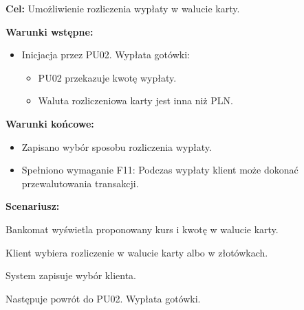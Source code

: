 \documentclass[10pt,a4paper]{article}
\begin{document}
\noindent\textbf{Cel:} Umożliwienie rozliczenia wypłaty w walucie karty.

\noindent\textbf{Warunki wstępne:}
\begin{itemize}
    \item Inicjacja przez PU02. Wypłata gotówki:
    \begin{itemize}
        \item PU02 przekazuje kwotę wypłaty.
        \item Waluta rozliczeniowa karty jest inna niż PLN.
    \end{itemize}
\end{itemize}

\noindent\textbf{Warunki końcowe:}
\begin{itemize}
    \item Zapisano wybór sposobu rozliczenia wypłaty.
    \item Spełniono wymaganie F11: Podczas wypłaty klient może dokonać przewalutowania transakcji.
\end{itemize}

\noindent\textbf{Scenariusz:}
\begin{scenariusz}
    \item Bankomat wyświetla proponowany kurs i kwotę w walucie karty.
    \item Klient wybiera rozliczenie w walucie karty albo w złotówkach.
    \item System zapisuje wybór klienta.
    \item Następuje powrót do PU02. Wypłata gotówki.
\end{scenariusz}
\end{document}
